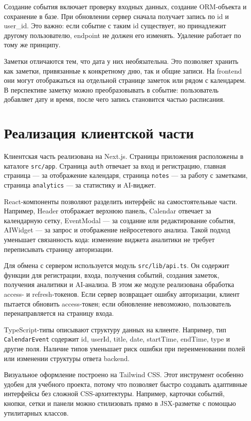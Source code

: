 \documentclass[14pt,a4paper]{extreport}
\begin{document}
Создание события включает проверку входных данных, создание ORM-объекта и сохранение в базе. При обновлении сервер сначала получает запись по id и user\_id. Это важно: если событие с таким id существует, но принадлежит другому пользователю, endpoint не должен его изменять. Удаление работает по тому же принципу.

Заметки отличаются тем, что дата у них необязательна. Это позволяет хранить как заметки, привязанные к конкретному дню, так и общие записи. На frontend они могут отображаться на отдельной странице заметок или рядом с календарем. В перспективе заметку можно преобразовывать в событие: пользователь добавляет дату и время, после чего запись становится частью расписания.

\section{Реализация клиентской части}

Клиентская часть реализована на Next.js. Страницы приложения расположены в каталоге \texttt{src/app}. Страница \texttt{auth} отвечает за вход и регистрацию, главная страница --- за отображение календаря, страница \texttt{notes} --- за работу с заметками, страница \texttt{analytics} --- за статистику и AI-виджет.

React-компоненты позволяют разделить интерфейс на самостоятельные части. Например, Header отображает верхнюю панель, Calendar отвечает за календарную сетку, EventModal --- за создание или редактирование события, AIWidget --- за запрос и отображение нейросетевого анализа. Такой подход уменьшает связанность кода: изменение виджета аналитики не требует переписывать страницу авторизации.

Для обмена с сервером используется модуль \texttt{src/lib/api.ts}. Он содержит функции для регистрации, входа, получения событий, создания заметок, получения аналитики и AI-анализа. В этом же модуле реализована обработка access- и refresh-токенов. Если сервер возвращает ошибку авторизации, клиент пытается обновить access-токен; если обновление невозможно, пользователь перенаправляется на страницу входа.

TypeScript-типы описывают структуру данных на клиенте. Например, тип \texttt{CalendarEvent} содержит id, userId, title, date, startTime, endTime, type и другие поля. Наличие типов уменьшает риск ошибки при переименовании полей или изменении структуры ответа backend.

Визуальное оформление построено на Tailwind CSS. Этот инструмент особенно удобен для учебного проекта, потому что позволяет быстро создавать адаптивные интерфейсы без сложной CSS-архитектуры. Например, карточки событий, кнопки, сетки и панели можно стилизовать прямо в JSX-разметке с помощью утилитарных классов.
\end{document}
